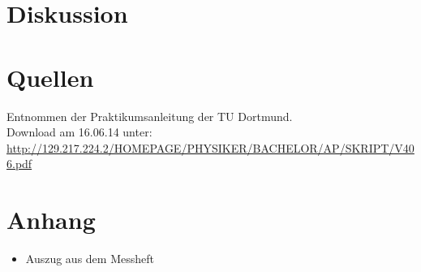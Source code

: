 \documentclass[11pt,ngerman,a4paper]{article}
\begin{document}
\subsection{}
\section{Diskussion}

\section{Quellen}
\begin{enumerate}[{[}1{]}]
\item Entnommen der Praktikumsanleitung \textit{} der TU Dortmund. \\
Download am 16.06.14 unter:\\
 \url{http://129.217.224.2/HOMEPAGE/PHYSIKER/BACHELOR/AP/SKRIPT/V406.pdf}
\end{enumerate}
\section{Anhang}
\begin{itemize}
\item Auszug aus dem Messheft
\end{itemize}
\end{document}
